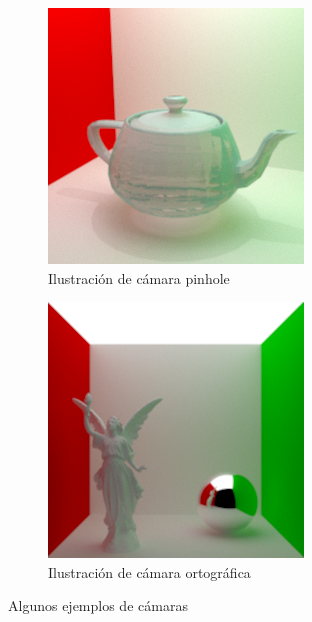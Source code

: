 \documentclass{article}
\begin{document}
\begin{figure}[H]
  \begin{subfigure}[h]{0.4\linewidth}
    \includegraphics[width=\linewidth]{imgs/crystal_teapot.png}
    \caption{Ilustración de cámara pinhole}
  \end{subfigure}
  \hfill
  \begin{subfigure}[h]{0.4\linewidth}
    \includegraphics[width=\linewidth]{imgs/lucy.png}
    \caption{Ilustración de cámara ortográfica}
  \end{subfigure}
  \caption{Algunos ejemplos de cámaras}
\end{figure}
\end{document}
